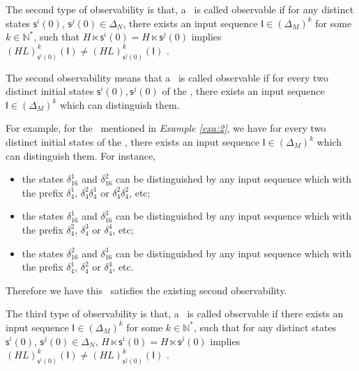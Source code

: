 \begin{definition}
	The second type of observability is that, a \BCN\ is called observable if for any distinct states $\mathsf{s}^{i}(0)$, $\mathsf{s}^{j}(0) \in \Delta_N$, there exists an input sequence $\mathsf{I}\in(\Delta_M)^k$ for some $k\in \mathbb{N}^*$, such that $H\ltimes\mathsf{s}^{i}(0)=H\ltimes\mathsf{s}^{j}(0)$ implies $(HL)^k_{\mathsf{s}^{i}(0)}(\mathsf{I})\neq (HL)^k_{\mathsf{s}^{j}(0)}(\mathsf{I})$ \cite{Zhao2010Input}.
\end{definition}

The second observability means that a \BCN\ is called observable if for every two distinct initial states $\mathsf{s}^{i}(0), \mathsf{s}^{j}(0)$ of the \BCN, there exists an input sequence $\mathsf{I}\in(\Delta_M)^k$ which can distinguish them. 
\begin{example}
For example, for the \BCN\ mentioned in {\em Example \ref{exa:2}}, we have for every two distinct initial states of the \BCN, there exists an input sequence $\mathsf{I}\in(\Delta_M)^k$ which can distinguish them.  For instance,
\begin{itemize}
  \item the states $\delta_{16}^1$ and $\delta_{16}^2$ can be distinguished by any input sequence which with the prefix $\delta_{4}^1$, $\delta_{4}^2 \delta_{4}^1$ or $\delta_{4}^2 \delta_{4}^2$, etc;
  \item the states $\delta_{16}^1$ and $\delta_{16}^3$  can be distinguished by any input sequence which with the prefix $\delta_{4}^2$, $\delta_{4}^3$ or $\delta_{4}^4$, etc;
  \item the states $\delta_{16}^2$ and $\delta_{16}^3$  can be distinguished by any input sequence which with the prefix $\delta_{4}^1$, $\delta_{4}^2$ or $\delta_{4}^4$, etc.
\end{itemize} 

Therefore we have this \BCN\ satisfies the existing second observability.
\label{exa:5}
\end{example}   
\begin{definition}
The third type of observability is that, a \BCN\ is called observable if there exists an input sequence $\mathsf{I}\in(\Delta_M)^k$ for some $k\in \mathbb{N}^*$, such that for any distinct states $\mathsf{s}^{i}(0)$, $\mathsf{s}^{j}(0) \in \Delta_N$, $H\ltimes\mathsf{s}^{i}(0)=H\ltimes\mathsf{s}^{j}(0)$ implies $(HL)^k_{\mathsf{s}^{i}(0)}(\mathsf{I})\neq (HL)^k_{\mathsf{s}^{j}(0)}(\mathsf{I})$ \cite{Cheng2011Identification}.
\end{definition}

